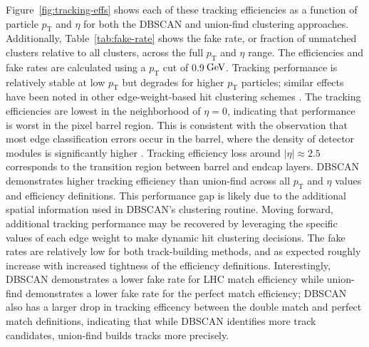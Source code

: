 \documentclass[twocolumn]{svjour3}
\newcommand{\pt}{\ensuremath{p_{\mathrm{T}}}\xspace}
\newcommand{\GeV}{\ensuremath{\,\text{Ge\hspace{-.08em}V}}\xspace}
\begin{document}
Figure~\ref{fig:tracking-effs} shows each of these tracking efficiencies as a function of particle $\pt$ and $\eta$ for both the DBSCAN and union-find clustering approaches. 
Additionally, Table~\ref{tab:fake-rate} shows the fake rate, or fraction of unmatched clusters relative to all clusters, across the full $\pt$ and $\eta$ range. 
The efficiencies and fake rates are calculated using a $\pt$ cut of 0.9\GeV.
Tracking performance is relatively stable at low $\pt$ but degrades for higher $\pt$ particles; similar effects have been noted in other edge-weight-based hit clustering schemes \cite{Biscarat:2021dlj}. 
The tracking efficiencies are lowest in the neighborhood of $\eta=0$, indicating that performance is worst in the pixel barrel region.
This is consistent with the observation that most edge classification errors occur in the barrel, where the density of detector modules is significantly higher \cite{TrackML}. 
Tracking efficiency loss around $|\eta|\approx 2.5$ corresponds to the transition region between barrel and endcap layers. 
DBSCAN demonstrates higher tracking efficiency than union-find across all $\pt$ and $\eta$ values and efficiency definitions. 
This performance gap is likely due to the additional spatial information used in DBSCAN's clustering routine. 
Moving forward, additional tracking performance may be recovered by leveraging the specific values of each edge weight to make dynamic hit clustering decisions. The fake rates are relatively low for both track-building methods, and as expected roughly increase with increased tightness of the efficiency definitions. 
Interestingly, DBSCAN demonstrates a lower fake rate for LHC match efficiency while union-find demonstrates a lower fake rate for the perfect match efficiency; DBSCAN also has a larger drop in tracking efficency between the double match and perfect match definitions, indicating that while DBSCAN identifies more track candidates, union-find builds tracks more precisely. 
\end{document}
